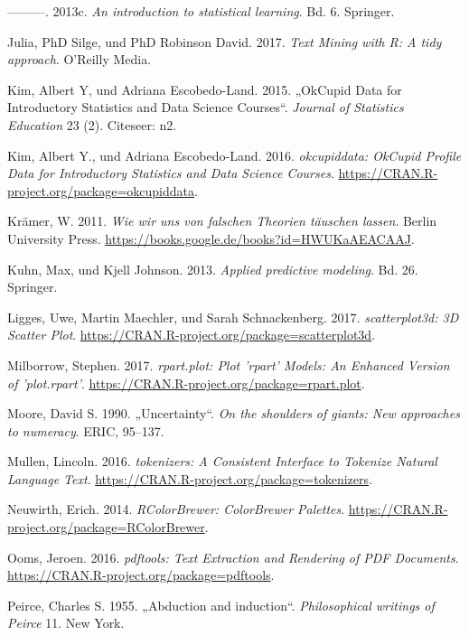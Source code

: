 \documentclass[12pt,ngerman,]{book}
\begin{document}
\hypertarget{ref-james2013introduction}{}
---------. 2013c. \emph{An introduction to statistical learning}. Bd. 6.
Springer.

\hypertarget{ref-tidytextminig}{}
Julia, PhD Silge, und PhD Robinson David. 2017. \emph{Text Mining with
R: A tidy approach}. O'Reilly Media.

\hypertarget{ref-kim2015okcupid}{}
Kim, Albert Y, und Adriana Escobedo-Land. 2015. „OkCupid Data for
Introductory Statistics and Data Science Courses``. \emph{Journal of
Statistics Education} 23 (2). Citeseer: n2.

\hypertarget{ref-R-okcupiddata}{}
Kim, Albert Y., und Adriana Escobedo-Land. 2016. \emph{okcupiddata:
OkCupid Profile Data for Introductory Statistics and Data Science
Courses}. \url{https://CRAN.R-project.org/package=okcupiddata}.

\hypertarget{ref-kraemer2011wir}{}
Krämer, W. 2011. \emph{Wie wir uns von falschen Theorien täuschen
lassen}. Berlin University Press.
\url{https://books.google.de/books?id=HWUKaAEACAAJ}.

\hypertarget{ref-kuhn2013applied}{}
Kuhn, Max, und Kjell Johnson. 2013. \emph{Applied predictive modeling}.
Bd. 26. Springer.

\hypertarget{ref-R-scatterplot3d}{}
Ligges, Uwe, Martin Maechler, und Sarah Schnackenberg. 2017.
\emph{scatterplot3d: 3D Scatter Plot}.
\url{https://CRAN.R-project.org/package=scatterplot3d}.

\hypertarget{ref-R-rpart.plot}{}
Milborrow, Stephen. 2017. \emph{rpart.plot: Plot 'rpart' Models: An
Enhanced Version of 'plot.rpart'}.
\url{https://CRAN.R-project.org/package=rpart.plot}.

\hypertarget{ref-moore1990uncertainty}{}
Moore, David S. 1990. „Uncertainty``. \emph{On the shoulders of giants:
New approaches to numeracy}. ERIC, 95--137.

\hypertarget{ref-R-tokenizers}{}
Mullen, Lincoln. 2016. \emph{tokenizers: A Consistent Interface to
Tokenize Natural Language Text}.
\url{https://CRAN.R-project.org/package=tokenizers}.

\hypertarget{ref-R-RColorBrewer}{}
Neuwirth, Erich. 2014. \emph{RColorBrewer: ColorBrewer Palettes}.
\url{https://CRAN.R-project.org/package=RColorBrewer}.

\hypertarget{ref-R-pdftools}{}
Ooms, Jeroen. 2016. \emph{pdftools: Text Extraction and Rendering of PDF
Documents}. \url{https://CRAN.R-project.org/package=pdftools}.

\hypertarget{ref-peirce1955abduction}{}
Peirce, Charles S. 1955. „Abduction and induction``. \emph{Philosophical
writings of Peirce} 11. New York.
\end{document}
